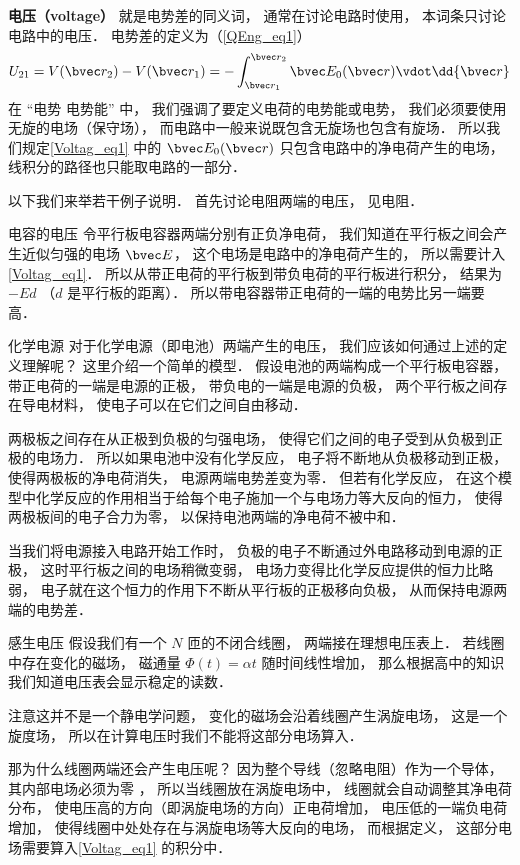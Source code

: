

\textbf{电压（voltage）} 就是电势差的同义词， 通常在讨论电路时使用， 本词条只讨论电路中的电压． 电势差的定义为（\autoref{QEng_eq1}）
\begin{equation}\label{Voltag_eq1}
U_{21} = V(\bvec r_2) - V(\bvec r_1) = - \int_{\bvec r_1}^{\bvec r_2} \bvec E_0(\bvec r) \vdot \dd{\bvec r}
\end{equation}
在 “电势 电势能” 中， 我们强调了要定义电荷的电势能或电势， 我们必须要使用无旋的电场（保守场）， 而电路中一般来说既包含无旋场也包含有旋场． 所以我们规定\autoref{Voltag_eq1} 中的 $\bvec E_0(\bvec r)$ 只包含电路中的净电荷产生的电场， 线积分的路径也只能取电路的一部分．

以下我们来举若干例子说明． 首先讨论电阻两端的电压， 见电阻．

\begin{example}{电容的电压}
令平行板电容器两端分别有正负净电荷， 我们知道在平行板之间会产生近似匀强的电场 $\bvec E$， 这个电场是电路中的净电荷产生的， 所以需要计入\autoref{Voltag_eq1}． 所以从带正电荷的平行板到带负电荷的平行板进行积分， 结果为 $-E d$ （$d$ 是平行板的距离）． 所以带电容器带正电荷的一端的电势比另一端要高．
\end{example}

\begin{example}{化学电源}
对于化学电源（即电池）两端产生的电压， 我们应该如何通过上述的定义理解呢？ 这里介绍一个简单的模型． 假设电池的两端构成一个平行板电容器， 带正电荷的一端是电源的正极， 带负电的一端是电源的负极， 两个平行板之间存在导电材料， 使电子可以在它们之间自由移动．

两极板之间存在从正极到负极的匀强电场， 使得它们之间的电子受到从负极到正极的电场力． 所以如果电池中没有化学反应， 电子将不断地从负极移动到正极， 使得两极板的净电荷消失， 电源两端电势差变为零． 但若有化学反应， 在这个模型中化学反应的作用相当于给每个电子施加一个与电场力等大反向的恒力， 使得两极板间的电子合力为零， 以保持电池两端的净电荷不被中和．

当我们将电源接入电路开始工作时， 负极的电子不断通过外电路移动到电源的正极， 这时平行板之间的电场稍微变弱， 电场力变得比化学反应提供的恒力比略弱， 电子就在这个恒力的作用下不断从平行板的正极移向负极， 从而保持电源两端的电势差．
\end{example}

\begin{example}{感生电压}
假设我们有一个 $N$ 匝的不闭合线圈， 两端接在理想电压表上． 若线圈中存在变化的磁场， 磁通量 $\Phi(t) = \alpha t$ 随时间线性增加， 那么根据高中的知识我们知道电压表会显示稳定的读数．

注意这并不是一个静电学问题， 变化的磁场会沿着线圈产生涡旋电场， 这是一个旋度场， 所以在计算电压时我们不能将这部分电场算入．

那为什么线圈两端还会产生电压呢？ 因为整个导线（忽略电阻）作为一个导体， 其内部电场必须为零%
， 所以当线圈放在涡旋电场中， 线圈就会自动调整其净电荷分布， 使电压高的方向（即涡旋电场的方向）正电荷增加， 电压低的一端负电荷增加， 使得线圈中处处存在与涡旋电场等大反向的电场， 而根据定义， 这部分电场需要算入\autoref{Voltag_eq1} 的积分中．
\end{example}

